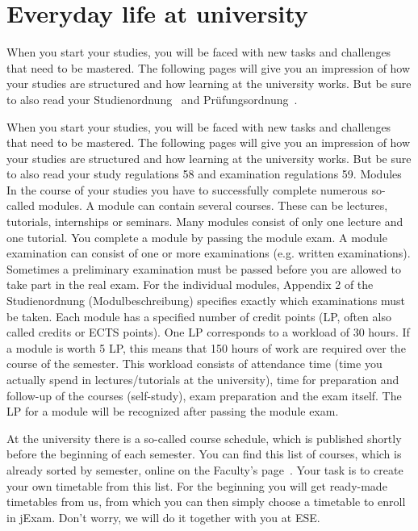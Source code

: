 \chapter{Everyday life at university}

When you start your studies, you will be faced with new tasks and challenges that need to be mastered. The following pages will give you an impression of how your studies are structured and how learning at the university works.
But be sure to also read your Studienordnung~
and Prüfungsordnung~.

When you start your studies, you will be faced with new tasks and challenges that need to be mastered. The following pages will give you an impression of how your studies are structured and how learning at the university works. But be sure to also read your study regulations 58 and examination regulations 59.
Modules
In the course of your studies you have to successfully complete numerous so-called modules. A module can contain several courses. These can be lectures, tutorials, internships or seminars. Many modules consist of only one lecture and one tutorial. You complete a module by passing the module exam. A module examination can consist of one or more examinations (e.g. written examinations). Sometimes a preliminary examination must be passed before you are allowed to take part in the real exam. For the individual modules, Appendix 2 of the Studienordnung (Modulbeschreibung) specifies exactly which examinations must be taken.
Each module has a specified number of credit points (LP, often also called credits or ECTS points). One LP corresponds to a workload of 30 hours. If a module is worth 5 LP, this means that 150 hours of work are required over the course of the semester. This workload consists of attendance time (time you actually spend in lectures/tutorials at the university), time for preparation and follow-up of the courses (self-study), exam preparation and the exam itself. The LP for a module will be recognized after passing the module exam.


At the university there is a so-called course schedule, which is published shortly before the beginning of each semester. You can find this list of courses, which is already sorted by semester, online on the Faculty's page~.
Your task is to create your own timetable from this list. For the beginning you will get ready-made timetables from us, from which you can then simply choose a timetable to enroll in jExam. Don't worry, we will do it together with you at ESE.

